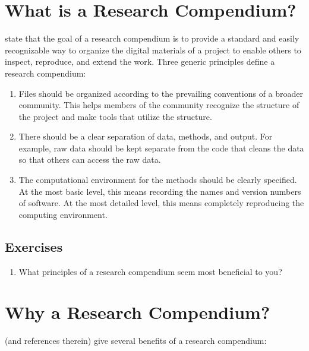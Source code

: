 \documentclass[
]{book}
\providecommand{\tightlist}{%
  \setlength{\itemsep}{0pt}\setlength{\parskip}{0pt}}
\begin{document}
\hypertarget{what-is-a-rc}{%
\section{What is a Research Compendium?}\label{what-is-a-rc}}

\citet{marwick2018packaging} state that the goal of a research compendium is to provide a standard and easily recognizable way to organize the digital materials of a project to enable others to inspect, reproduce, and extend the work. Three generic principles define a research compendium:

\begin{enumerate}
\def\labelenumi{\arabic{enumi}.}
\item
  Files should be organized according to the prevailing conventions of a broader community. This helps members of the community recognize the structure of the project and make tools that utilize the structure.
\item
  There should be a clear separation of data, methods, and output. For example, raw data should be kept separate from the code that cleans the data so that others can access the raw data.
\item
  The computational environment for the methods should be clearly specified. At the most basic level, this means recording the names and version numbers of software. At the most detailed level, this means completely reproducing the computing environment.
\end{enumerate}

\hypertarget{ex-set7}{%
\subsection{Exercises}\label{ex-set7}}

\begin{enumerate}
\def\labelenumi{\arabic{enumi}.}
\tightlist
\item
  What principles of a research compendium seem most beneficial to you?
\end{enumerate}

\hypertarget{why-a-rc}{%
\section{Why a Research Compendium?}\label{why-a-rc}}

\citet{marwick2018packaging} (and references therein) give several benefits of a research compendium:
\end{document}
